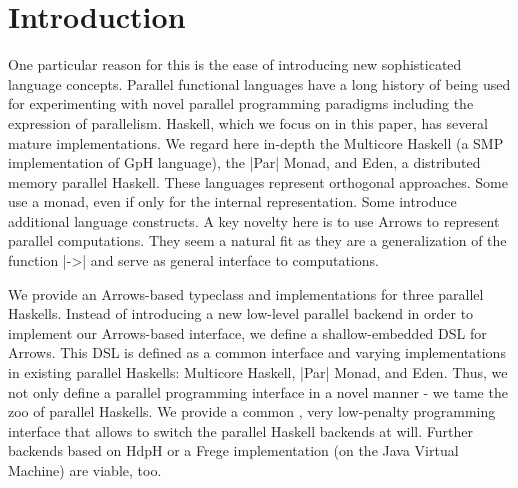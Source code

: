 
\section{Introduction}
\label{sec:introduction}
%
%
%

One particular reason for this is the ease of introducing new sophisticated language
concepts. Parallel functional languages have a long history of being used for experimenting with novel parallel programming paradigms including the expression of parallelism. Haskell, which we focus on in this paper, has  several mature implementations. We regard here in-depth
the Multicore Haskell (a SMP implementation of GpH language), the
|Par| Monad, and Eden, a distributed memory parallel Haskell. These
languages represent orthogonal approaches. Some use a monad, even if
only for the internal representation. Some introduce additional
language constructs. 
A key novelty here is to use Arrows to represent parallel computations. They seem a natural fit as they are a generalization of the function |->| and serve as general interface to computations.

We provide an Arrows-based typeclass and implementations for three parallel Haskells.
Instead of 
introducing a new low-level parallel backend in order to implement our
Arrows-based interface, we define a shallow-embedded DSL for Arrows. This DSL
is defined as a common interface and varying implementations in
existing parallel Haskells: Multicore Haskell, |Par| Monad, and
Eden. Thus, we not only define a parallel programming interface in a
novel manner - we tame the zoo of parallel Haskells. We provide a
common , very low-penalty programming interface that allows to switch
the parallel Haskell backends at will. Further backends based on HdpH or a Frege implementation (on the Java Virtual Machine) are viable, too.

